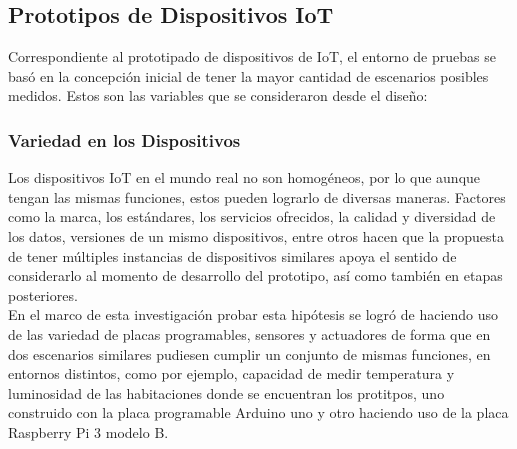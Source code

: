 \subsection{Prototipos de Dispositivos IoT}
Correspondiente al prototipado de dispositivos de IoT, el entorno de pruebas se basó en la concepción inicial de tener la mayor cantidad de escenarios posibles medidos. Estos son las variables que se consideraron desde el diseño: 

\subsubsection{Variedad en los Dispositivos}
Los dispositivos IoT en el mundo real no son homogéneos, por lo que aunque tengan las mismas funciones, estos pueden lograrlo de diversas maneras. Factores como la marca, los estándares, los servicios ofrecidos, la calidad y diversidad de los datos, versiones de un mismo dispositivos, entre otros hacen que la propuesta de tener múltiples instancias de dispositivos similares apoya el sentido de considerarlo al momento de desarrollo del prototipo, así como también en etapas posteriores.\\

En el marco de esta investigación probar esta hipótesis se logró de haciendo uso de las variedad de placas programables, sensores y actuadores de forma que en dos escenarios similares pudiesen cumplir un conjunto de mismas funciones, en entornos distintos, como por ejemplo, capacidad de medir temperatura y luminosidad de las habitaciones donde se encuentran los protitpos, uno construido con la placa programable Arduino uno y otro haciendo uso de la placa Raspberry Pi 3 modelo B.\\

